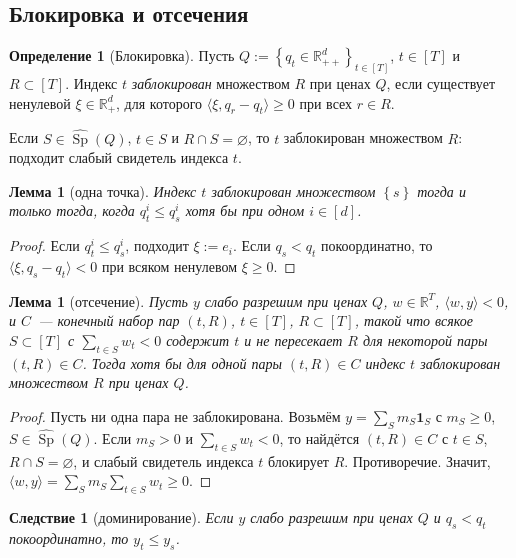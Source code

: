 \documentclass[a4paper,11pt]{article}
\theoremstyle{plain}
\newtheorem{lemma}[theorem]{Лемма}
\newtheorem{corollary}[theorem]{Следствие}
\theoremstyle{definition}
\newtheorem{definition}[theorem]{Определение}
\theoremstyle{remark}
\newcommand{\R}{\mathbb{R}}
\newcommand{\set}[1]{\left\{ #1 \right\}}
\newcommand{\ip}[2]{\langle #1, #2\rangle} %
\newcommand{\Rpp}[1][2]{\R^{#1}_{++}} %
\newcommand{\Rp}[1][2]{\R^{#1}_{+}}   %
\DeclareMathOperator{\Sp}{Sp}
\begin{document}
\subsection{Блокировка и отсечения}

\begin{definition}[Блокировка]\label{def:blocked}
    Пусть $Q:=\set{q_t\in\Rpp[d]}_{t\in[T]}$, $t\in[T]$ и $R\subset[T]$. Индекс $t$ \textit{заблокирован} множеством $R$ при ценах $Q$, если существует ненулевой $\xi\in\Rp[d]$, для которого $\ip{\xi}{q_r-q_t}\ge0$ при всех $r\in R$.
\end{definition}

Если $S\in\widehat{\Sp}(Q)$, $t\in S$ и $R\cap S=\varnothing$, то $t$ заблокирован множеством $R$: подходит слабый свидетель индекса $t$.

\begin{lemma}[одна точка]\label{lem:block1}
    Индекс $t$ заблокирован множеством $\set s$ тогда и только тогда, когда $q^i_t\le q^i_s$ хотя бы при одном $i\in[d]$.
\end{lemma}

\begin{proof}
    Если $q^i_t\le q^i_s$, подходит $\xi:=e_i$. Если $q_s<q_t$ покоординатно, то $\ip{\xi}{q_s-q_t}<0$ при всяком ненулевом $\xi\ge0$.
\end{proof}

\begin{lemma}[отсечение]\label{lem:cut}
    Пусть $y$ слабо разрешим при ценах $Q$, $w\in\R^T$, $\ip{w}{y}<0$, и $C$~--- конечный набор пар $(t,R)$, $t\in[T]$, $R\subset[T]$, такой что всякое $S\subset[T]$ с $\sum_{t\in S}w_t<0$ содержит $t$ и не пересекает $R$ для некоторой пары $(t,R)\in C$. Тогда хотя бы для одной пары $(t,R)\in C$ индекс $t$ заблокирован множеством $R$ при ценах $Q$.
\end{lemma}

\begin{proof}
    Пусть ни одна пара не заблокирована. Возьмём $y=\sum_Sm_S\mathbf 1_S$ с $m_S\ge0$, $S\in\widehat{\Sp}(Q)$. Если $m_S>0$ и $\sum_{t\in S}w_t<0$, то найдётся $(t,R)\in C$ с $t\in S$, $R\cap S=\varnothing$, и слабый свидетель индекса $t$ блокирует $R$. Противоречие. Значит, $\ip{w}{y}=\sum_Sm_S\sum_{t\in S}w_t\ge0$.
\end{proof}

\begin{corollary}[доминирование]\label{cor:dominance}
    Если $y$ слабо разрешим при ценах $Q$ и $q_s<q_t$ покоординатно, то $y_t\le y_s$.
\end{corollary}
\end{document}
